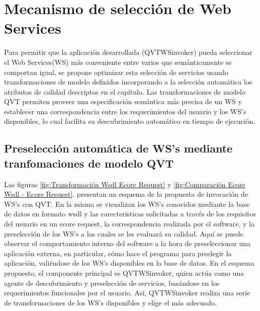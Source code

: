 \chapter{Mecanismo de selección de Web Services}
\label{Mecanismo de selección de Web Services}

Para permitir que la aplicación desarrollada (QVTWSinvoker) pueda seleccionar el Web Services(WS) más conveniente entre varios que semánticamente se comportan igual, se propone optimizar esta selección de servicios usando transformaciones de modelo definidos incorporando a la selección automática los atributos de calidad descriptos en el capítulo. Las transformaciones de modelo QVT permiten proveer una especificación semántica más precisa de un WS y establecer una correspondencia entre los requerimientos del usuario y los WS's disponibles, lo cual facilita su descubrimiento automático en tiempo de ejecución. 

\section{Preselección automática de WS's mediante tranfomaciones de modelo QVT}
\label{Preselección automática de WS's mediante tranfomaciones de modelo QVT}

Las figuras \ref{fig:Transformación Wsdl Ecore Request} y \ref{fig:Comparación Ecore Wsdl - Ecore Request}. presentan un esquema de la propuesta de invocación de WS's con QVT. En la misma se visualizan los WS's conocidos mediante la base de datos en formato wsdl y las carecteristicas solicitadas a través de los requisitos del usuario en un ecore request, la correspondencia realizada por el software, y la preselección de los WS's a los cuales se les evaluará su calidad. Aquí se puede observar el comportamiento interno del software a la hora de preseleccionar una aplicación externa, en particular, cómo hace el programa para preelegir la aplicación, valiéndose de los WS's disponibles en la base de datos. En el esquema propuesto, el componente principal es QVTWSinvoker, quien actúa como una agente de descubrimiento y preselección de servicios, basándose en los requerimientos funcionales por el usuario. Así, QVTWSinvoker  realiza una serie de transformaciones de los WS's disponibles y elige el más adecuado. 

